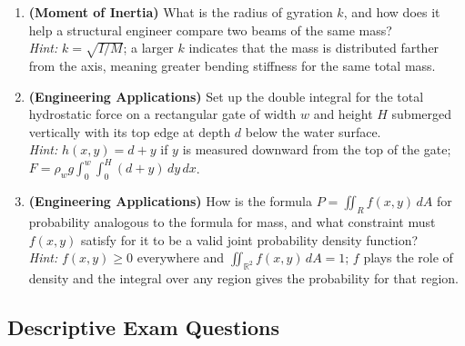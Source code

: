 \documentclass[12pt,a4paper]{article}
\begin{document}
\begin{enumerate}[label=\textbf{V\arabic*.}]
  \item \textbf{(Moment of Inertia)} What is the radius of gyration \(k\), and how does it help a structural engineer compare two beams of the same mass? \\
  \textit{Hint:} \(k = \sqrt{I/M}\); a larger \(k\) indicates that the mass is distributed farther from the axis, meaning greater bending stiffness for the same total mass.

  \item \textbf{(Engineering Applications)} Set up the double integral for the total hydrostatic force on a rectangular gate of width \(w\) and height \(H\) submerged vertically with its top edge at depth \(d\) below the water surface. \\
  \textit{Hint:} \(h(x,y) = d + y\) if \(y\) is measured downward from the top of the gate; \(F = \rho_w g \int_0^w \int_0^H (d+y)\,dy\,dx\).

  \item \textbf{(Engineering Applications)} How is the formula \(P = \iint_R f(x,y)\,dA\) for probability analogous to the formula for mass, and what constraint must \(f(x,y)\) satisfy for it to be a valid joint probability density function? \\
  \textit{Hint:} \(f(x,y) \geq 0\) everywhere and \(\iint_{\mathbb{R}^2} f(x,y)\,dA = 1\); \(f\) plays the role of density and the integral over any region gives the probability for that region.

\end{enumerate}

\subsection*{Descriptive Exam Questions}
\end{document}
